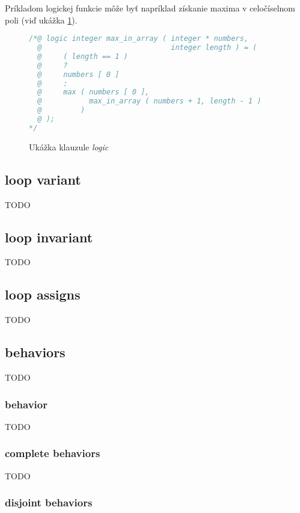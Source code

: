 Príkladom logickej funkcie môže byť napríklad získanie maxima v celočíselnom poli (viď ukážka \ref{fig:logic}).

\begin{figure}[H]
    \centering
    \captionsetup{justification=centering}
\begin{lstlisting}[language=C]
/*@ logic integer max_in_array ( integer * numbers, 
  @                              integer length ) = (
  @     ( length == 1 )
  @     ?
  @     numbers [ 0 ]
  @     :
  @     max ( numbers [ 0 ], 
  @           max_in_array ( numbers + 1, length - 1 ) 
  @         )
  @ );
*/
\end{lstlisting}
    \caption{Ukážka klauzule \emph{logic}}
    \label{fig:logic}
\end{figure}

\subsection{loop variant}

TODO

\subsection{loop invariant}

TODO

\subsection{loop assigns}

TODO

\subsection{behaviors}

TODO

\subsubsection{behavior}

TODO

\subsubsection{complete behaviors}

TODO

\subsubsection{disjoint behaviors}

